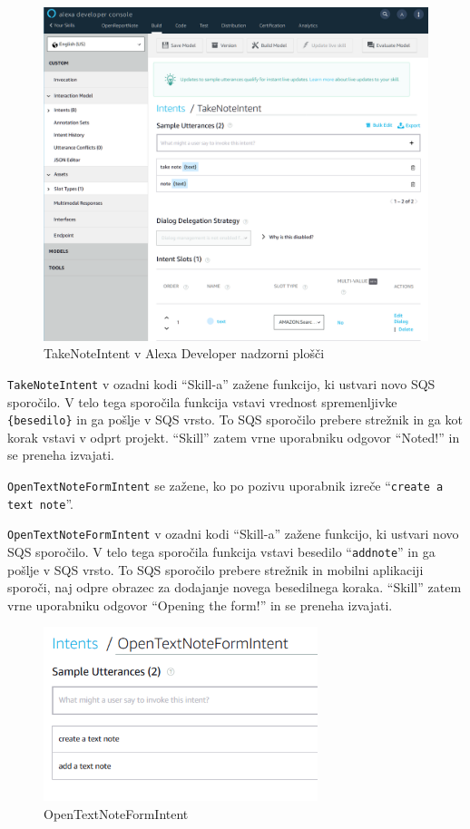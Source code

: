 \documentclass[a4paper, 12pt]{book}
\begin{document}
\begin{figure}[H]
\begin{center}
\includegraphics[width=13cm]{intent_literal}
\end{center}
\caption{TakeNoteIntent v Alexa Developer nadzorni plošči}
\label{TakeNoteIntent}
\end{figure}

\texttt{TakeNoteIntent} v ozadni kodi \enquote{Skill-a} zažene funkcijo, ki ustvari novo SQS sporočilo.
V telo tega sporočila funkcija vstavi vrednost spremenljivke \texttt{\{besedilo\}} in ga pošlje v SQS vrsto.
To SQS sporočilo prebere strežnik in ga kot korak vstavi v odprt projekt.
\enquote{Skill} zatem vrne uporabniku odgovor \enquote{Noted!} in se preneha izvajati.

\texttt{OpenTextNoteFormIntent} se zažene, ko po pozivu uporabnik izreče \enquote{\texttt{create a text note}}.

\texttt{OpenTextNoteFormIntent} v ozadni kodi \enquote{Skill-a} zažene funkcijo, ki ustvari novo SQS sporočilo.
V telo tega sporočila funkcija vstavi besedilo \enquote{\texttt{addnote}} in ga pošlje v SQS vrsto.
To SQS sporočilo prebere strežnik in mobilni aplikaciji sporoči, naj odpre obrazec za dodajanje novega besedilnega koraka.
\enquote{Skill} zatem vrne uporabniku odgovor \enquote{Opening the form!} in se preneha izvajati.


\begin{figure}[H]
\begin{center}
\includegraphics[width=8cm]{intent_text}
\end{center}
\caption{OpenTextNoteFormIntent}
\label{OpenTextNoteFormIntent}
\end{figure}
\end{document}
